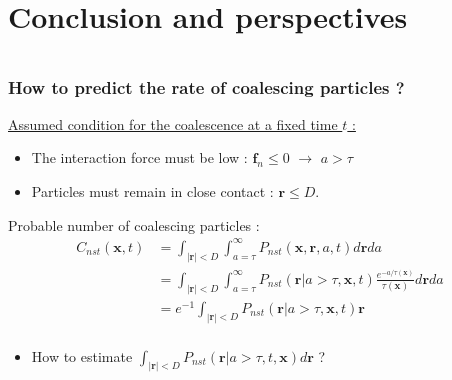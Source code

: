 \documentclass{sintefbeamer}
\begin{document}
\section{Conclusion and perspectives}
\section*{}

\begin{frame}
  \frametitle{How to predict the rate of coalescing particles ?}
  \underline{Assumed condition for the coalescence at a fixed time $t$ :}
  \begin{itemize}
    \item The interaction force must be low : $\textbf{f}_n \leq 0$ $\rightarrow$ $a > \tau$
    \item Particles must remain in close contact : $\textbf{r} \leq D$. 
  \end{itemize}
  \vfill
  Probable number of coalescing particles : 
  \begin{align*}
    C_{nst}(\textbf{x},t) 
    &= \int_{|\textbf{r}|<D}\int_{a = \tau}^\infty P_{nst}(\textbf{x},\textbf{r},a,t)  d\textbf{r}da\\
    &= \int_{|\textbf{r}|<D}\int_{a = \tau}^\infty P_{nst}(\textbf{r}|a>\tau,\textbf{x},t)\frac{e^{-a/\tau(\textbf{x})}}{\tau(\textbf{x})}  d\textbf{r}da\\
    &= e^{-1}\int_{|\textbf{r}|<D} P_{nst}(\textbf{r}| a > \tau,\textbf{x},t)  \textbf{r}\\
  \end{align*}
\begin{itemize}
  \item How to estimate $\int_{|\textbf{r}|<D} P_{nst}(\textbf{r}| a > \tau,t,\textbf{x})  d\textbf{r}$ ? 
\end{itemize}
\end{frame}
\end{document}
